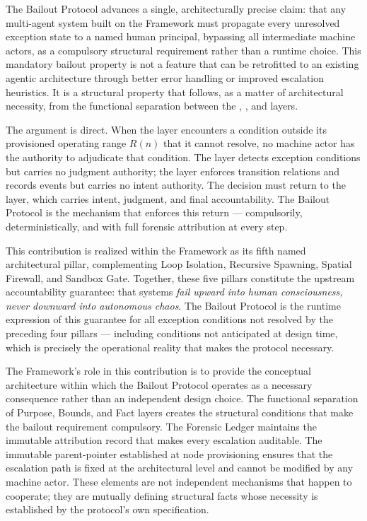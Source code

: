 The Bailout Protocol advances a single, architecturally precise claim: that any multi-agent system built on the \bxthree{} Framework must propagate every unresolved exception state to a named human principal, bypassing all intermediate machine actors, as a compulsory structural requirement rather than a runtime choice. This mandatory bailout property is not a feature that can be retrofitted to an existing agentic architecture through better error handling or improved escalation heuristics. It is a structural property that follows, as a matter of architectural necessity, from the functional separation between the \purpose{}, \bounds{}, and \fact{} layers.

The argument is direct. When the \bounds{} layer encounters a condition outside its provisioned operating range $R(n)$ that it cannot resolve, no machine actor has the authority to adjudicate that condition. The \bounds{} layer detects exception conditions but carries no judgment authority; the \fact{} layer enforces transition relations and records events but carries no intent authority. The decision must return to the \purpose{} layer, which carries intent, judgment, and final accountability. The Bailout Protocol is the mechanism that enforces this return — compulsorily, deterministically, and with full forensic attribution at every step.

This contribution is realized within the \bxthree{} Framework as its fifth named architectural pillar, complementing Loop Isolation, Recursive Spawning, Spatial Firewall, and Sandbox Gate. Together, these five pillars constitute the upstream accountability guarantee: that \bxthree{} systems \emph{fail upward into human consciousness, never downward into autonomous chaos}. The Bailout Protocol is the runtime expression of this guarantee for all exception conditions not resolved by the preceding four pillars — including conditions not anticipated at design time, which is precisely the operational reality that makes the protocol necessary.

The \bxthree{} Framework's role in this contribution is to provide the conceptual architecture within which the Bailout Protocol operates as a necessary consequence rather than an independent design choice. The functional separation of Purpose, Bounds, and Fact layers creates the structural conditions that make the bailout requirement compulsory. The Forensic Ledger maintains the immutable attribution record that makes every escalation auditable. The immutable parent-pointer established at node provisioning ensures that the escalation path is fixed at the architectural level and cannot be modified by any machine actor. These elements are not independent mechanisms that happen to cooperate; they are mutually defining structural facts whose necessity is established by the protocol's own specification.

